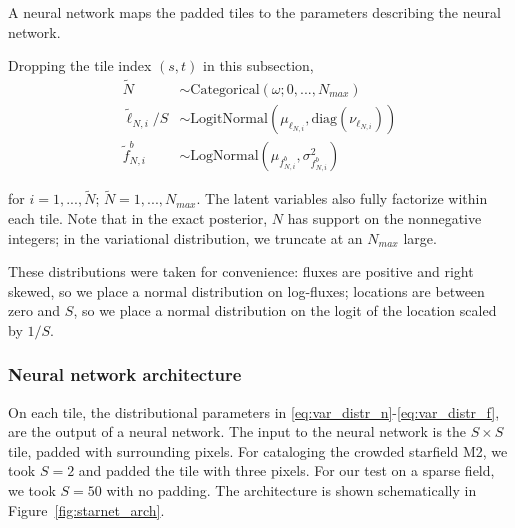 A neural network maps the padded tiles to the 
parameters describing the neural network. 

Dropping the tile index $(s, t)$ in this subsection,
\begin{align}
    \tilde N &\sim \text{Categorical}(\omega; 0, ..., N_{max}) \label{eq:var_distr_n}\\
	\tilde \ell_{N, i} / S &\sim \text{LogitNormal}(\mu_{\ell_{N, i}}, \text{diag}(\nu_{\ell_{N, i}}) )\label{eq:var_distr_loc}\\
	\tilde f^b_{N, i} &\sim \text{LogNormal}(\mu_{f^b_{N, i}}, \sigma^2_{f^b_{N, i}}) \label{eq:var_distr_f}
\end{align}


for $i = 1, ..., \tilde N$; $\tilde N = 1, ..., N_{max}$. The latent variables also fully factorize within each tile. Note that in the exact posterior, $N$ has support on the nonnegative integers; in the variational distribution, we truncate at an $N_{max}$ large.


These distributions were taken for convenience: fluxes are positive and right skewed, so we place a normal distribution on log-fluxes; locations are between zero and $S$, so 
we place a normal distribution on the logit of the location scaled by $1 / S$. 

\subsubsection{Neural network architecture}
On each tile, the distributional parameters 
in \eqref{eq:var_distr_n}-\eqref{eq:var_distr_f}, are the output of a neural network.
The input to the neural network is the $S \times S$ tile, padded with surrounding pixels.
For cataloging the crowded starfield M2,
we took $S = 2$ and padded the tile with three pixels. 
For our test on a sparse field, we took $S = 50$ with no padding. 
The architecture is shown schematically in Figure~\ref{fig:starnet_arch}. 


